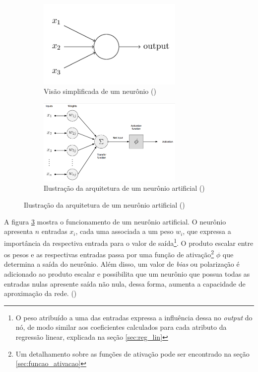 \begin{figure}[H] 
  \centering
  \begin{subfigure}{7cm}
    \centering 
    \includegraphics[width=7cm]{../figuras/perceptron-simples.png}
    \caption{Visão simplificada de um neurônio (\cite{deeplearningbook})}
    \label{fig:perceptron-simples}
  \end{subfigure}
  \hfill
  \begin{subfigure}{7cm}
    \centering
    \includegraphics[width=7cm]{../figuras/perceptron.png}
    \caption{Ilustração da arquitetura de um 
    neurônio artificial (\cite{dl-oreilly})}
    \label{fig:perceptron}
  \end{subfigure}
\end{figure}

A figura \ref{fig:perceptron} mostra o funcionamento de 
um neurônio artificial. O neurônio apresenta $n$ entradas 
$x_i$, cada uma associada a um peso $w_i$, que expressa 
a importância da respectiva entrada para o valor de saída\footnote{ 
O peso atribuído a uma das entradas expressa a influência
dessa no \textit{output} do nó, de modo similar aos coeficientes calculados 
para cada atributo da regressão linear, explicada na seção \ref{sec:reg_lin}}.
O produto escalar entre os pesos e as respectivas entradas
 passa por uma função de 
ativação\footnote{Um detalhamento sobre as funções de 
ativação pode ser encontrado na seção \ref{sec:funcao_ativacao}} 
$\phi$ que determina a saída do neurônio. 
Além disso, um valor de \textit{bias} ou polarização é
adicionado ao produto escalar e possibilita que 
um neurônio que possua todas as entradas nulas
apresente saída não nula, dessa forma,
aumenta a capacidade de aproximação da rede. 
(\cite{deeplearningbook})

